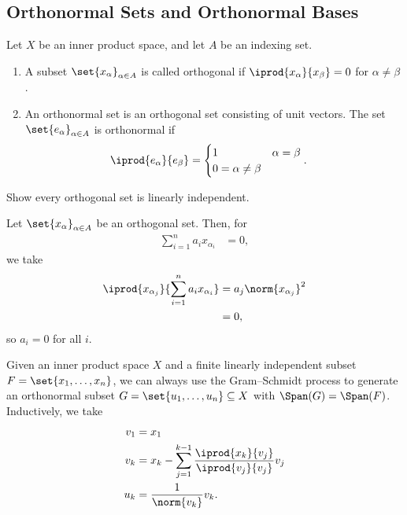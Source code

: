 \documentclass[10pt]{mypackage}
\begin{document}
\subsection{Orthonormal Sets and Orthonormal Bases}%
\begin{definition}
  Let $X$ be an inner product space, and let $A$ be an indexing set.
  \begin{enumerate}[(1)]
    \item A subset $\set{x_{\alpha}}_{\alpha\in A}$ is called orthogonal if $ \iprod{x_{\alpha}}{x_{\beta}} = 0 $ for $\alpha \neq \beta$.
    \item An orthonormal set is an orthogonal set consisting of unit vectors. The set $\set{e_{\alpha}}_{\alpha \in A}$ is orthonormal if
      \begin{align*}
        \iprod{e_{\alpha}}{e_{\beta}} &= \begin{cases}
          1 & \alpha = \beta\\
          0 = \alpha \neq \beta
        \end{cases}.
      \end{align*}
  \end{enumerate}
\end{definition}
\begin{exercise}
  Show every orthogonal set is linearly independent.
\end{exercise}
\begin{solution}
  Let $\set{x_{\alpha}}_{\alpha\in A}$ be an orthogonal set. Then, for
  \begin{align*}
    \sum_{i=1}^{n}a_ix_{\alpha_i} &= 0,
  \end{align*}
  we take
  \begin{align*}
    \iprod{x_{\alpha_j}}{\sum_{i=1}^{n}a_ix_{\alpha_i}} &= a_j\norm{x_{\alpha_j}}^2\\
                                                        &= 0,
  \end{align*}
  so $a_i = 0$ for all $i$.
\end{solution}
\begin{remark}
  Given an inner product space $X$ and a finite linearly independent subset $F = \set{x_1,\dots,x_n}$, we can always use the Gram--Schmidt process to generate an orthonormal subset $G = \set{u_1,\dots,u_n}\subseteq X$ with $\Span(G) = \Span(F)$. Inductively, we take
  \begin{align*}
    v_1 &= x_1\\
    v_{k} &= x_k - \sum_{j=1}^{k-1}\frac{ \iprod{x_k}{v_j} }{ \iprod{v_j}{v_j} }v_j\\
    u_k &= \frac{1}{\norm{v_k}}v_k.
  \end{align*}
\end{remark}
\end{document}
